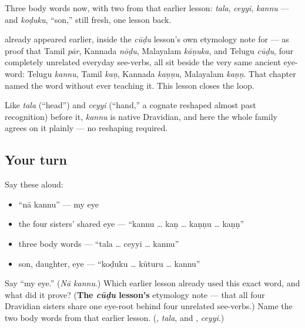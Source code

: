 Three body words now, with two from that earlier lesson: \emph{tala}, \emph{ceyyi}, \emph{kannu} — and \emph{koḍuku}, \textquotedblleft{}son,\textquotedblright{} still fresh, one lesson back.

\begin{cousinweb}
\textbf{} already appeared earlier, inside the \emph{cūḍu} lesson's own etymology note for \textbf{} — as proof that Tamil \emph{pār}, Kannada \emph{nōḍu}, Malayalam \emph{kāṇuka}, and Telugu \emph{cūḍu}, four completely unrelated everyday see-verbs, all sit beside the very same ancient eye-word: Telugu \emph{kannu}, Tamil \emph{kaṇ}, Kannada \emph{kaṇṇu}, Malayalam \emph{kaṇṇ}. That chapter named the word without ever teaching it. This lesson closes the loop.

Like \emph{tala} (\textquotedblleft{}head\textquotedblright{}) and \emph{ceyyi} (\textquotedblleft{}hand,\textquotedblright{} a cognate reshaped almost past recognition) before it, \emph{kannu} is native Dravidian, and here the whole family agrees on it plainly — no reshaping required.
\end{cousinweb}

\subsection*{Your turn}
Say these aloud:

\begin{itemize}
\raggedright
  \item \textquotedblleft{}nā kannu\textquotedblright{} — my eye
  \item the four sisters' shared eye — \textquotedblleft{}kannu … kaṇ … kaṇṇu … kaṇṇ\textquotedblright{}
  \item three body words — \textquotedblleft{}tala … ceyyi … kannu\textquotedblright{}
  \item son, daughter, eye — \textquotedblleft{}koḍuku … kūturu … kannu\textquotedblright{}
\end{itemize}

\begin{tcolorbox}[breakable,colback=teal!4,colframe=teal!35!black,title={Before you move on}]
Say \textquotedblleft{}my eye.\textquotedblright{} (\emph{Nā kannu}.) Which earlier lesson already used this exact word, and what did it prove? (\textbf{The \emph{cūḍu} lesson's} etymology note — that all four Dravidian sisters share one eye-root behind four unrelated see-verbs.) Name the two body words from that earlier lesson. (\textbf{}, \emph{tala}, and \textbf{}, \emph{ceyyi}.)
\end{tcolorbox}

